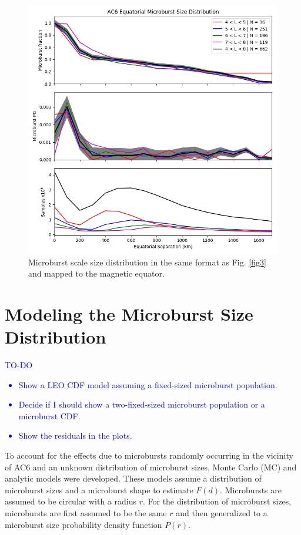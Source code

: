 \documentclass[draft]{agujournal2019}
\begin{document}
\begin{figure}
\includegraphics[width=\textwidth]{fig4.png}
\caption{Microburst scale size distribution in the same format as Fig. \ref{fig3} and mapped to the magnetic equator.} 
\label{fig4}
\end{figure}

\section{Modeling the Microburst Size Distribution}
\textcolor{blue}{
TO-DO
\begin{itemize}
\item Show a LEO CDF model assuming a fixed-sized microburst population.
\item Decide if I should show a two-fixed-sized microburst population or a microburst CDF.
\item Show the residuals in the plots.
\end{itemize}
}

To account for the effects due to microbursts randomly occurring in the vicinity of AC6 and an unknown distribution of microburst sizes, Monte Carlo (MC) and analytic models were developed. These models assume a distribution of microburst sizes and a microburst shape to estimate $F(d)$. Microbursts are assumed to be circular with a radius $r$. For the distribution of microburst sizes, microbursts are first assumed to be the same $r$ and then generalized to a microburst size probability density function $P(r)$.
\end{document}
